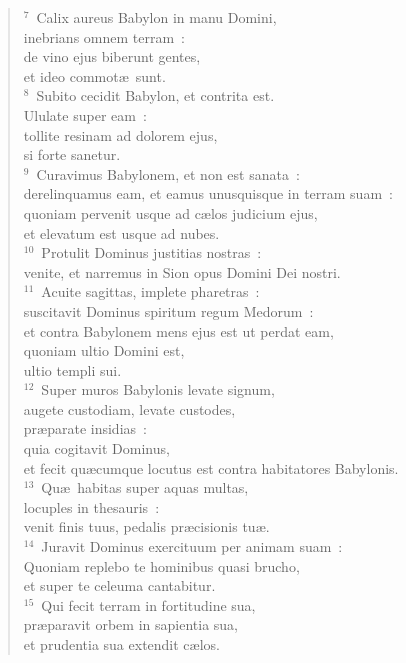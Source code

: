 \begin{flushleft}
\begin{verse}
${}^{7}$~Calix aureus Babylon in manu Domini,\\ inebrians omnem terram~:\\ de vino ejus biberunt gentes,\\ et ideo commot\ae\ sunt.\\
${}^{8}$~Subito cecidit Babylon, et contrita est.\\ Ululate super eam~:\\ tollite resinam ad dolorem ejus,\\ si forte sanetur.\\
${}^{9}$~Curavimus Babylonem, et non est sanata~:\\ derelinquamus eam, et eamus unusquisque in terram suam~:\\ quoniam pervenit usque ad c\ae los judicium ejus,\\ et elevatum est usque ad nubes.\\
${}^{10}$~Protulit Dominus justitias nostras~:\\ venite, et narremus in Sion opus Domini Dei nostri.\\
${}^{11}$~Acuite sagittas, implete pharetras~:\\ suscitavit Dominus spiritum regum Medorum~:\\ et contra Babylonem mens ejus est ut perdat eam,\\ quoniam ultio Domini est,\\ ultio templi sui.\\
${}^{12}$~Super muros Babylonis levate signum,\\ augete custodiam, levate custodes,\\ pr\ae parate insidias~:\\ quia cogitavit Dominus,\\ et fecit qu\ae cumque locutus est contra habitatores Babylonis.\\
${}^{13}$~Qu\ae\ habitas super aquas multas,\\ locuples in thesauris~:\\ venit finis tuus, pedalis pr\ae cisionis tu\ae .\\
${}^{14}$~Juravit Dominus exercituum per animam suam~:\\ Quoniam replebo te hominibus quasi brucho,\\ et super te celeuma cantabitur.\\
${}^{15}$~Qui fecit terram in fortitudine sua,\\ pr\ae paravit orbem in sapientia sua,\\ et prudentia sua extendit c\ae los.\\

\end{verse}
\end{flushleft}
